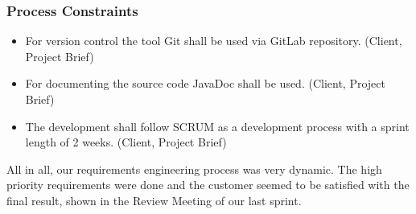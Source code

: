 \subsubsection{Process Constraints}
\begin{itemize}
    \item For version control the tool Git shall be used via GitLab repository. (Client, Project Brief)
    \item For documenting the source code JavaDoc shall be used. (Client, Project Brief)
    \item The development shall follow SCRUM as a development process with a sprint length of 2 weeks. (Client, Project Brief)
\end{itemize}

All in all, our requirements engineering process was very dynamic. The high priority requirements were done and the customer seemed to be satisfied with the final result, shown in the Review Meeting of our last sprint.